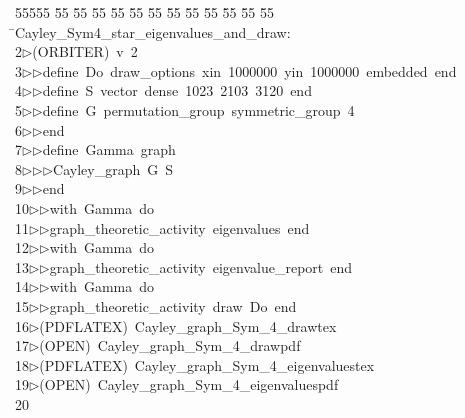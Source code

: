 %
%
\begin{tabbing}
55555 \= 55 \= 55 \= 55 \= 55 \= 55 \= 55 \= 55 \= 55 \= 55 \= 55 \= 55 \= 55 \= \>Cayley\_Sym4\_star\_eigenvalues\_and\_draw:\\[0pt]
2\>$\triangleright$\>(ORBITER)\ v\ 2\ \\[0pt]
3\>$\triangleright$\>$\triangleright$\>define\ Do\ draw\_options\ xin\ 1000000\ yin\ 1000000\ embedded\ end\ \\[0pt]
4\>$\triangleright$\>$\triangleright$\>define\ S\ vector\ dense\ 1023\ 2103\ 3120\ end\ \\[0pt]
5\>$\triangleright$\>$\triangleright$\>define\ G\ permutation\_group\ symmetric\_group\ 4\ \\[0pt]
6\>$\triangleright$\>$\triangleright$\>end\ \\[0pt]
7\>$\triangleright$\>$\triangleright$\>define\ Gamma\ graph\ \\[0pt]
8\>$\triangleright$\>$\triangleright$\>$\triangleright$\>Cayley\_graph\ G\ S\ \\[0pt]
9\>$\triangleright$\>$\triangleright$\>end\ \\[0pt]
10\>$\triangleright$\>$\triangleright$\>with\ Gamma\ do\ \\[0pt]
11\>$\triangleright$\>$\triangleright$\>graph\_theoretic\_activity\ eigenvalues\ end\ \\[0pt]
12\>$\triangleright$\>$\triangleright$\>with\ Gamma\ do\ \\[0pt]
13\>$\triangleright$\>$\triangleright$\>graph\_theoretic\_activity\ eigenvalue\_report\ end\ \\[0pt]
14\>$\triangleright$\>$\triangleright$\>with\ Gamma\ do\ \\[0pt]
15\>$\triangleright$\>$\triangleright$\>graph\_theoretic\_activity\ draw\ Do\ end\\[0pt]
16\>$\triangleright$\>(PDFLATEX)\ Cayley\_graph\_Sym\_4\_drawtex\\[0pt]
17\>$\triangleright$\>(OPEN)\ Cayley\_graph\_Sym\_4\_drawpdf\\[0pt]
18\>$\triangleright$\>(PDFLATEX)\ Cayley\_graph\_Sym\_4\_eigenvaluestex\\[0pt]
19\>$\triangleright$\>(OPEN)\ Cayley\_graph\_Sym\_4\_eigenvaluespdf\\[0pt]
20\>\end{tabbing}
